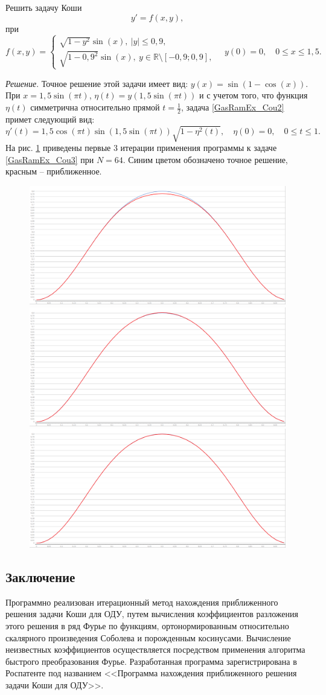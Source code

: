 \begin{example}
Решить задачу Коши
\begin{equation}\label{GasRamEx_Cou2}
y'=f(x,y),
\end{equation}
при
\begin{equation*}
f(x,y)=
\begin{cases}
\sqrt{1-y^2}\sin(x),\ |y|\leq 0,9,\\
\sqrt{1-0,9^2}\sin(x),\ y\in\mathbb{R}\setminus[-0,9;0,9],
\end{cases}
\quad y(0)=0, \quad 0\leq x\leq 1,5.
\end{equation*}
\end{example}
\textit{ Решение}. Точное решение этой задачи имеет вид: $y(x)=\sin(1-\cos(x))$. При $x=1,5\sin(\pi t)$, $\eta(t)=y(1,5\sin(\pi t))$ и с учетом того, что функция $\eta(t)$ симметрична относительно прямой $t=\frac12$, задача \eqref{GasRamEx_Cou2} примет следующий вид:
\begin{equation}\label{GasRamEx_Cou3}
\eta'(t)=1,5\cos(\pi t) \sin(1,5\sin(\pi t)) \sqrt{1-\eta^2(t)}, \quad \eta(0)=0, \quad 0\leq t\leq 1.
\end{equation}
На рис. \ref{pic2} приведены первые 3 итерации применения программы к задаче \eqref{GasRamEx_Cou3} при $N=64$. Синим цветом обозначено точное решение, красным -- приближенное.
\begin{figure}
\includegraphics[width=.32\linewidth]{pictures/Ex2_image1_64(1)}
\includegraphics[width=.32\linewidth]{pictures/Ex2_image1_64(2)}
\includegraphics[width=.32\linewidth]{pictures/Ex2_image1_64(3)}
\caption{}
\label{pic2}
\end{figure}




\subsection{Заключение}


Программно реализован итерационный метод нахождения приближенного решения задачи Коши для ОДУ, путем вычисления коэффициентов разложения этого решения в ряд Фурье по функциям, ортонормированным
относительно скалярного произведения Соболева и порожденным косинусами.
Вычисление неизвестных коэффициентов осуществляется посредством применения алгоритма быстрого преобразования Фурье. Разработанная программа зарегистрирована в Роспатенте под названием <<Программа нахождения приближенного решения задачи Коши для ОДУ>>.



